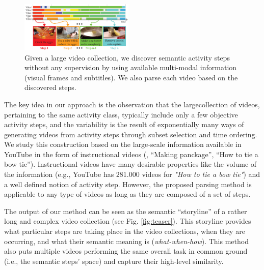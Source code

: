 
\begin{figure}[h!]
  \includegraphics[width=0.48\textwidth]{Figure_1_flattened}
  \caption{Given a large video collection, we discover semantic activity steps without any supervision by using available multi-modal information (visual frames and subtitles). We also parse each video based on the discovered steps.}
  \label{teaser}
\end{figure}


The key idea in our approach is the observation that the largecollection of videos, pertaining to the same activity class, typically include only a few objective activity steps, and the variability is the result of exponentially many ways of generating videos from activity steps through subset selection and time ordering. We study this construction based on the large-scale information available in YouTube in the form of instructional videos  (\eg, ``Making panckage'', ``How to tie a bow tie''). Instructional videos have many desirable properties like the volume of the information (e.g., YouTube has 281.000 videos for \emph{"How to tie a bow tie"}) and a well defined notion of activity step.  However, the proposed parsing method is applicable to any type of videos as long as they are composed of a set of steps.

The output of our method can be seen as the semantic ``storyline'' of a rather long and complex video collection (see Fig. \ref{fig:teaser}). This storyline provides what particular steps are taking place in the video collections, when they are occurring, and what their semantic meaning is (\emph{what-when-how}). This method also puts multiple videos performing the same overall task in common ground (i.e., the semantic steps’ space) and capture their high-level similarity.

